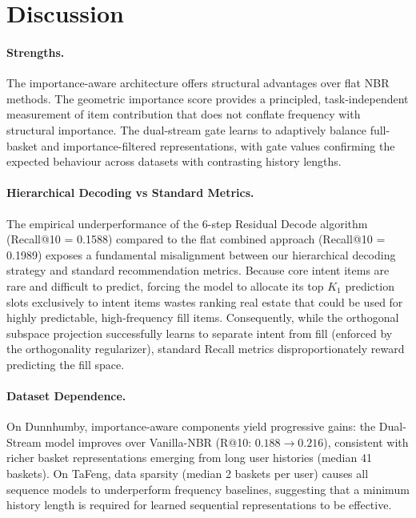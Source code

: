 \documentclass[conference]{IEEEtran}
\begin{document}
\section{Discussion}
\label{sec:discussion}

\paragraph{Strengths.}
The importance-aware architecture offers structural advantages over flat NBR methods. The geometric importance score provides a principled, task-independent measurement of item contribution that does not conflate frequency with structural importance. The dual-stream gate learns to adaptively balance full-basket and importance-filtered representations, with gate values confirming the expected behaviour across datasets with contrasting history lengths.

\paragraph{Hierarchical Decoding vs Standard Metrics.}
The empirical underperformance of the 6-step Residual Decode algorithm (Recall@10 = 0.1588) compared to the flat combined approach (Recall@10 = 0.1989) exposes a fundamental misalignment between our hierarchical decoding strategy and standard recommendation metrics. Because core intent items are rare and difficult to predict, forcing the model to allocate its top $K_1$ prediction slots exclusively to intent items wastes ranking real estate that could be used for highly predictable, high-frequency fill items. Consequently, while the orthogonal subspace projection successfully learns to separate intent from fill (enforced by the orthogonality regularizer), standard Recall metrics disproportionately reward predicting the fill space.

\paragraph{Dataset Dependence.}
On Dunnhumby, importance-aware components yield progressive gains: the Dual-Stream model improves over Vanilla-NBR (R@10: $0.188 \to 0.216$), consistent with richer basket representations emerging from long user histories (median 41 baskets). On TaFeng, data sparsity (median 2 baskets per user) causes all sequence models to underperform frequency baselines, suggesting that a minimum history length is required for learned sequential representations to be effective.
\end{document}
